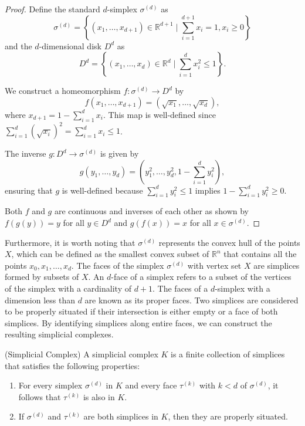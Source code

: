 \begin{proof}
	Define the standard $d$-simplex $\sigma^{(d)}$ as
	\[
		\sigma^{(d)}= \left\{(x_{1}, \ldots, x_{d+1}) \in \mathbb{R}^{d+1}\mid \sum_{i=1}
		^{d+1}x_{i} = 1, x_{i} \geq 0 \right\}
	\]
	and the $d$-dimensional disk $D^{d}$ as
	\[
		D^{d} = \left\{(x_{1}, \ldots, x_{d}) \in \mathbb{R}^{d} \mid \sum_{i=1}^{d}
		x_{i}^{2} \leq 1\right\}.
	\]

	We construct a homeomorphism $f: \sigma^{(d)}\rightarrow D^{d}$ by
	\[
		f(x_{1}, \ldots, x_{d+1}) = (\sqrt{x_{1}}, \ldots, \sqrt{x_{d}}),
	\]
	where $x_{d+1}= 1 - \sum_{i=1}^{d} x_{i}$. This map is well-defined since $\sum
	_{i=1}^{d} (\sqrt{x_{i}})^{2} = \sum_{i=1}^{d} x_{i} \leq 1$.

	The inverse $g: D^{d} \rightarrow \sigma^{(d)}$ is given by
	\[
		g(y_{1}, \ldots, y_{d}) = (y_{1}^{2}, \ldots, y_{d}^{2}, 1 - \sum_{i=1}^{d} y
		_{i}^{2}),
	\]
	ensuring that $g$ is well-defined because $\sum_{i=1}^{d} y_{i}^{2} \leq 1$ implies
	$1 - \sum_{i=1}^{d} y_{i}^{2} \geq 0$.

	Both $f$ and $g$ are continuous and inverses of each other as shown by $f(g(y))
	= y$ for all $y \in D^{d}$ and $g(f(x)) = x$ for all $x \in \sigma^{(d)}$.
\end{proof}

Furthermore, it is worth noting that $\sigma^{(d)}$ represents the convex hull
of the points $X$, which can be defined as the smallest convex subset of $\mathbb{R}
^{n}$ that contains all the points $x_{0}, x_{1}, \ldots, x_{d}$. The faces of
the simplex $\sigma^{(d)}$ with vertex set $X$ are simplices formed by subsets
of $X$. An $d$-face of a simplex refers to a subset of the vertices of the simplex
with a cardinality of $d+1$. The faces of a $d$-simplex with a dimension less
than $d$ are known as its proper faces. Two simplices are considered to be properly
situated if their intersection is either empty or a face of both simplices. By
identifying simplices along entire faces, we can construct the resulting simplicial
complexes.

\begin{definition}
	{(Simplicial Complex) \cite[§2.2]{boissonnat2018geometric}} \label{simplicialcomplex}
	A simplicial complex $K$ is a finite collection of simplices that satisfies the
	following properties:
	\begin{enumerate}
		\item For every simplex $\sigma^{(d)}$ in $K$ and every face $\tau^{(k)}$ with
			$k < d$ of $\sigma^{(d)}$, it follows that $\tau^{(k)}$ is also in $K$.

		\item If $\sigma^{(d)}$ and $\tau^{(k)}$ are both simplices in $K$, then
			they are properly situated.
	\end{enumerate}
\end{definition}

